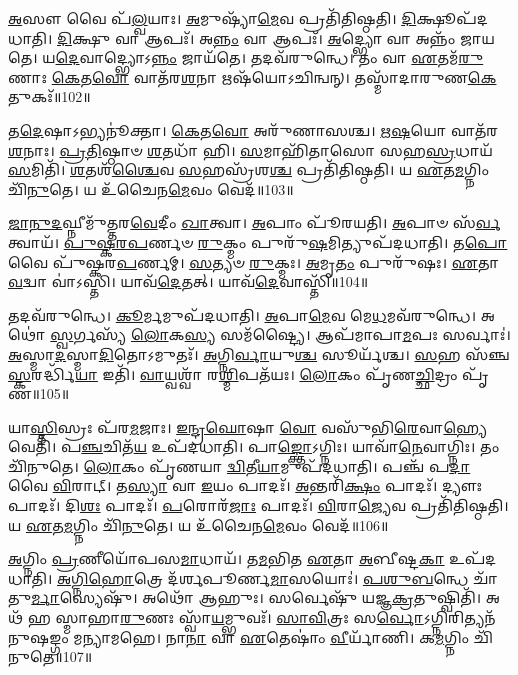 \-\ul{𑌅}\-𑌸𑍗 𑌵𑍈 𑌪᳴\-\ul{𑌲𑍍𑌵}\-𑌯𑌾𑌃। \ul{𑌅}\-𑌮𑍁𑌷𑍍𑌯𑌾᳴\-\ul{𑌮𑍇}\-𑌵 𑌪𑍍𑌰𑌤𑌿᳴𑌤𑌿𑌷𑍍𑌠𑌤𑌿। 
\-\ul{𑌦𑌿}\-𑌕𑍍𑌷𑍂𑌪᳴𑌦𑌧𑌾𑌤𑌿। \ul{𑌦𑌿}\-𑌕𑍍𑌷𑍁 𑌵𑌾 𑌆𑌪𑌃᳴। 
𑌅\-\ul{𑌨𑍍𑌨𑌂} 𑌵𑌾 𑌆𑌪𑌃᳴। \ul{𑌅}\-𑌦𑍍𑌭𑍍𑌯𑍋 𑌵𑌾 𑌅𑌨𑍍𑌨𑌂᳴ 𑌜𑌾𑌯𑌤𑍇। 
𑌯\-\ul{𑌦𑍇}\-𑌵𑌾𑌦𑍍𑌭𑍍𑌯𑍋𑌽\-\ul{𑌨𑍍𑌨𑌂} 𑌜𑌾𑌯᳴𑌤𑍇। 𑌤𑌦𑌵᳴𑌰𑍁𑌨𑍍𑌧𑍇। 
𑌤𑌂 𑌵𑌾 \ul{𑌏}\-𑌤𑌮᳴\-\ul{𑌰𑍁}\-𑌣𑌾𑌃 \ul{𑌕𑍇}\-𑌤\-\ul{𑌵𑍋} 𑌵𑌾𑌤᳴𑌰\-\ul{𑌶}\-𑌨𑌾 𑌋𑌷᳴𑌯𑍋𑌽𑌚𑌿𑌨𑍍𑌵𑌨𑍍। 
𑌤𑌸𑍍𑌮𑌾᳴𑌦𑌾𑌰𑍁𑌣\-\ul{𑌕𑍇}\-𑌤𑍁𑌕𑌃᳴॥102॥


𑌤\-\ul{𑌦𑍇}\-𑌷𑌾𑌽𑌭𑍍𑌯𑌨𑍂॑𑌕𑍍𑌤𑌾। \ul{𑌕𑍇}\-𑌤\-\ul{𑌵𑍋} 𑌅𑌰𑍁᳴𑌣𑌾𑌸𑌶𑍍𑌚। 
\-\ul{𑌋}\-\-\ul{𑌷}\-𑌯𑍋 𑌵𑌾𑌤᳴𑌰\-\ul{𑌶}\-𑌨𑌾𑌃। \ul{𑌪𑍍𑌰}\-\-\ul{𑌤𑌿}\-𑌷𑍍𑌠𑌾𑍞 \ul{𑌶}\-𑌤𑌧𑌾᳴ 𑌹𑌿। 
\-\ul{𑌸}\-𑌮𑌾𑌹𑌿᳴𑌤𑌾𑌸𑍋 𑌸𑌹\-\ul{𑌸𑍍𑌰}\-𑌧𑌾𑌯᳴\-\ul{𑌸}\-𑌮𑌿𑌤𑌿᳴। \ul{𑌶}\-𑌤𑌶᳴\-\ul{𑌶𑍍𑌚𑍈}\-𑌵 \ul{𑌸}\-𑌹𑌸𑍍𑌰᳴𑌶\-\ul{𑌶𑍍𑌚} 𑌪𑍍𑌰𑌤𑌿᳴𑌤𑌿𑌷𑍍𑌠𑌤𑌿। 
𑌯 \ul{𑌏}\-𑌤\-\ul{𑌮}\-𑌗𑍍𑌨𑌿𑌂 𑌚𑌿᳴\-\ul{𑌨𑍁}\-𑌤𑍇। 𑌯 𑌉᳴𑌚𑍈𑌨\-\ul{𑌮𑍇}\-𑌵𑌂 𑌵𑍇𑌦᳴॥103॥\anuvakamend


\-\ul{𑌜𑌾}\-\-\ul{𑌨𑍁}\-\-\ul{𑌦}\-𑌘𑍍𑌨𑍀𑌮𑍁᳴𑌤𑍍𑌤𑌰\-\ul{𑌵𑍇}\-𑌦𑍀𑌂 \ul{𑌖𑌾}\-𑌤𑍍𑌵𑌾। \ul{𑌅}\-𑌪𑌾𑌂 𑌪𑍂᳴𑌰𑌯𑌤𑌿। 
\-\ul{𑌅}\-𑌪𑌾𑍞 𑌸᳴\-\ul{𑌰𑍍𑌵}\-𑌤𑍍𑌵𑌾𑌯᳴। \ul{𑌪𑍁}\-\-\ul{𑌷𑍍𑌕}\-\-\ul{𑌰}\-\-\ul{𑌪}\-𑌰𑍍𑌣𑍞 \ul{𑌰𑍁}\-𑌕𑍍𑌮𑌂 𑌪𑍁𑌰𑍁᳴\-\ul{𑌷}\-𑌮𑌿𑌤𑍍𑌯𑍁𑌪᳴𑌦𑌧𑌾𑌤𑌿। 
𑌤\-\ul{𑌪𑍋} 𑌵𑍈 𑌪𑍁᳴𑌷𑍍𑌕𑌰\-\ul{𑌪}\-𑌰𑍍𑌣𑌮𑍍। \ul{𑌸}\-𑌤𑍍𑌯𑍞 \ul{𑌰𑍁}\-𑌕𑍍𑌮𑌃। 
\-\ul{𑌅}\-𑌮𑍃\-\ul{𑌤𑌂} 𑌪𑍁𑌰𑍁᳴𑌷𑌃। \ul{𑌏}\-𑌤𑌾\-\ul{𑌵}\-𑌦𑍍𑌵𑌾 𑌵𑌾॑𑌽𑌸𑍍𑌤𑌿। 
𑌯𑌾𑌵᳴\-\ul{𑌦𑍇}\-𑌤𑌤𑍍। 𑌯𑌾𑌵᳴\-\ul{𑌦𑍇}\-𑌵𑌾𑌸𑍍𑌤𑌿᳴॥104॥


𑌤𑌦𑌵᳴𑌰𑍁𑌨𑍍𑌧𑍇। \ul{𑌕𑍂}\-𑌰𑍍𑌮𑌮𑍁𑌪᳴𑌦𑌧𑌾𑌤𑌿। 
\-\ul{𑌅}\-𑌪𑌾\-\ul{𑌮𑍇}\-𑌵 𑌮𑍇\-\ul{𑌧}\-𑌮𑌵᳴𑌰𑍁𑌨𑍍𑌧𑍇। 𑌅𑌥𑍋॑ \ul{𑌸𑍍𑌵}\-𑌰𑍍𑌗𑌸𑍍𑌯᳴ \ul{𑌲𑍋}\-𑌕\-\ul{𑌸𑍍𑌯} 𑌸𑌮᳴𑌷𑍍𑌟𑍍𑌯𑍈। 
𑌆𑌪᳴𑌮𑌾𑌪𑌾\-\ul{𑌮}\-𑌪𑌃 𑌸𑌰𑍍𑌵𑌾𑌃॑। \ul{𑌅}\-𑌸𑍍𑌮𑌾\-\-\ul{𑌦}\-𑌸𑍍𑌮𑌾\-\-\ul{𑌦𑌿}\-𑌤𑍋\-𑌽𑌮𑍁𑌤𑌃᳴। 
\-\ul{𑌅}\-𑌗𑍍𑌨𑌿\-\ul{𑌰𑍍𑌵𑌾}\-𑌯𑍁\-\ul{𑌶𑍍𑌚} 𑌸𑍂𑌰𑍍𑌯᳴𑌶𑍍𑌚। \ul{𑌸}\-𑌹 𑌸᳴𑌞𑍍𑌚\-\ul{𑌸𑍍𑌕}\-𑌰𑌰𑍍𑌦𑍍𑌧𑌿᳴\-\ul{𑌯𑌾} 𑌇𑌤𑌿᳴। 
\-\ul{𑌵𑌾}\-𑌯𑍍𑌵𑌶𑍍𑌵𑌾᳴ 𑌰\-\ul{𑌶𑍍𑌮𑌿}\-𑌪𑌤᳴𑌯𑌃। \ul{𑌲𑍋}\-𑌕𑌂 𑌪𑍃᳴𑌣\-\ul{𑌚𑍍𑌛𑌿}\-𑌦𑍍𑌰𑌂 𑌪𑍃᳴𑌣॥105॥


𑌯𑌾\-\ul{𑌸𑍍𑌤𑌿}\-𑌸𑍍𑌰𑌃 𑌪᳴𑌰\-\ul{𑌮}\-𑌜𑌾𑌃। \ul{𑌇}\-\-\ul{𑌨𑍍𑌦𑍍𑌰}\-\-\ul{𑌘𑍋}\-𑌷𑌾 \ul{𑌵𑍋} 𑌵𑌸𑍁᳴𑌭𑌿\-\ul{𑌰𑍇}\-𑌵𑌾\-\ul{𑌹𑍍𑌯𑍇}\-𑌵𑍇𑌤𑌿᳴। 
𑌪\-\ul{𑌞𑍍𑌚}\-\-𑌚𑌿𑌤᳴\-\ul{𑌯} 𑌉𑌪᳴𑌦𑌧𑌾𑌤𑌿। 𑌪𑌾\-\ul{𑌙𑍍𑌕𑍍𑌤𑍋}\-𑌽𑌗𑍍𑌨𑌿𑌃। 
𑌯𑌾𑌵𑌾᳴\-\ul{𑌨𑍇}\-𑌵𑌾𑌗𑍍𑌨𑌿𑌃। 𑌤𑌂 𑌚𑌿᳴𑌨𑍁𑌤𑍇। 
\-\ul{𑌲𑍋}\-𑌕𑌂 𑌪𑍃᳴𑌣𑌯𑌾 \ul{𑌦𑍍𑌵𑌿}\-𑌤𑍀\-\ul{𑌯𑌾}\-𑌮𑍁𑌪᳴𑌦𑌧𑌾𑌤𑌿। 𑌪𑌞𑍍𑌚᳴ 𑌪\-\ul{𑌦𑌾} 𑌵𑍈 \ul{𑌵𑌿}\-𑌰𑌾𑌟𑍍। 
𑌤\-\ul{𑌸𑍍𑌯𑌾} 𑌵𑌾 \ul{𑌇}\-𑌯𑌂 𑌪𑌾𑌦𑌃᳴। \ul{𑌅}\-𑌨𑍍𑌤𑌰𑌿᳴\-\ul{𑌕𑍍𑌷𑌂} 𑌪𑌾𑌦𑌃᳴। 𑌦𑍍𑌯𑍗𑌃 𑌪𑌾𑌦𑌃᳴। 
𑌦𑌿\-\ul{𑌶𑌃} 𑌪𑌾𑌦𑌃᳴। \ul{𑌪}\-𑌰𑍋𑌰᳴\-\ul{𑌜𑌾𑌃} 𑌪𑌾𑌦𑌃᳴। \ul{𑌵𑌿}\-𑌰𑌾\-\ul{𑌜𑍍𑌯𑍇}\-𑌵 𑌪𑍍𑌰𑌤𑌿᳴𑌤𑌿𑌷𑍍𑌠𑌤𑌿। 
𑌯 \ul{𑌏}\-𑌤\-\ul{𑌮}\-𑌗𑍍𑌨𑌿𑌂 𑌚𑌿᳴\-\ul{𑌨𑍁}\-𑌤𑍇। 𑌯 𑌉᳴𑌚𑍈𑌨\-\ul{𑌮𑍇}\-𑌵𑌂 𑌵𑍇𑌦᳴॥106॥\anuvakamend


\-\ul{𑌅}\-𑌗𑍍𑌨𑌿𑌂 \ul{𑌪𑍍𑌰}\-𑌣𑍀𑌯𑍋᳴𑌪𑌸\-\ul{𑌮𑌾}\-𑌧𑌾𑌯᳴। 𑌤\-\ul{𑌮}\-𑌭𑌿𑌤 \ul{𑌏}\-𑌤𑌾 \ul{𑌅}\-𑌬𑍀𑌷𑍍𑌟\-\ul{𑌕𑌾} 𑌉𑌪᳴𑌦𑌧𑌾𑌤𑌿। 
\-\ul{𑌅}\-\-\ul{𑌗𑍍𑌨𑌿}\-\-\ul{𑌹𑍋}\-𑌤𑍍𑌰𑍇 𑌦᳴𑌰𑍍𑌶𑌪𑍂𑌰𑍍𑌣\-\ul{𑌮𑌾}\-𑌸𑌯𑍋𑌃॑। \ul{𑌪}\-\-\ul{𑌶𑍁}\-\-\ul{𑌬}\-𑌨𑍍𑌧𑍇 𑌚𑌾᳴𑌤𑍁\-\ul{𑌰𑍍𑌮𑌾}\-𑌸𑍍𑌯𑍇𑌷𑍁᳴। 
𑌅𑌥𑍋᳴ 𑌆𑌹𑍁𑌃। 𑌸𑌰𑍍𑌵𑍇𑌷𑍁᳴ 𑌯𑌜𑍍𑌞\-\ul{𑌕𑍍𑌰}\-𑌤𑍁𑌷𑍍𑌵𑌿𑌤𑌿᳴। 
𑌅𑌥᳴ 𑌹 𑌸𑍍𑌮𑌾𑌹𑌾\-\ul{𑌰𑍁}\-𑌣𑌃 𑌸𑍍𑌵𑌾᳴\-\ul{𑌯}\-𑌮𑍍𑌭𑍁𑌵𑌃᳴। \ul{𑌸𑌾}\-\-\ul{𑌵𑌿}\-𑌤𑍍𑌰𑌃 𑌸\-\ul{𑌰𑍍𑌵𑍋}\-𑌽𑌗𑍍𑌨𑌿𑌰𑌿𑌤𑍍𑌯𑌨᳴𑌨𑍁𑌷𑌙𑍍𑌗𑌂 𑌮𑌨𑍍𑌯𑌾𑌮𑌹𑍇। 
𑌨𑌾\-\ul{𑌨𑌾} 𑌵𑌾 \ul{𑌏}\-𑌤𑍇𑌷𑌾𑌂॑ \ul{𑌵𑍀}\-𑌰𑍍𑌯𑌾᳴𑌣𑌿। 𑌕\-\ul{𑌮}\-𑌗𑍍𑌨𑌿𑌂 𑌚𑌿᳴𑌨𑍁𑌤𑍇॥107॥


